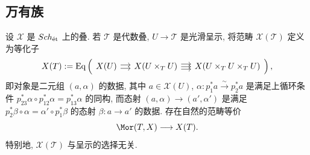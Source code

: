 \raggedbottom
\subsection{万有族}\label{src:4.1.7-subsection}
\begin{lemma}[广义 $2$-Yoneda 引理]\label{src:4.1.27}
设 $\mathcal X$ 是 $Sch_{\text{ét}}$ 上的叠. 若 $\mathcal T$ 是代数叠, $U\to\mathcal T$ 是光滑呈示, 将范畴 $\mathcal X(\mathcal T)$ 定义为等化子
\[
\mathcal X(\mathcal T):=\operatorname{Eq}\left(
\begin{tikzcd}[column sep=small]
\mathcal X(U)\arrow[r,shift left=2pt]\arrow[r,shift right=2pt]&
\mathcal X(U\times_{\mathcal T}U)\arrow[r,shift left=3pt]\arrow[r]\arrow[r,shift right=3pt]&
\mathcal X(U\times_{\mathcal T}U\times_{\mathcal T}U)
\end{tikzcd}
\right),
\]
即对象是二元组 $(a,\alpha)$ 的数据, 其中 $a\in\mathcal X(U)$, $\alpha:p_1^*a\xrightarrow{\sim}p_2^*a$ 是满足上循环条件 $p_{23}^*\alpha\circ p_{12}^*\alpha=p_{13}^*\alpha$ 的同构, 而态射 $(a,\alpha)\to(a',\alpha')$ 是满足 $p_2^*\beta\circ\alpha=\alpha'\circ p_1^*\beta$ 的态射 $\beta:a\to a'$ 的数据.
存在自然的范畴等价
\begin{equation}\label{src:4.1.28}
\Mor(\mathcal T,\mathcal X)\longrightarrow\mathcal X(\mathcal T).
\end{equation}
特别地, $\mathcal X(\mathcal T)$ 与呈示的选择无关.
\end{lemma}
